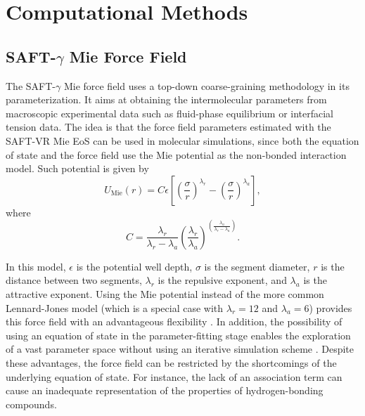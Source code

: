 \documentclass[preprint]{elsarticle}
\begin{document}
	\section{Computational Methods}
	
	\subsection{SAFT-$\gamma$ Mie Force Field}
	
	The SAFT-$\gamma$ Mie force field uses a top-down coarse-graining methodology in its parameterization. It aims at obtaining the intermolecular parameters from macroscopic experimental data such as fluid-phase equilibrium or interfacial tension data. The idea is that the force field parameters estimated with the SAFT-VR Mie EoS \cite{lafitte2013} can be used in molecular simulations, since both the equation of state and the force field use the Mie potential as the non-bonded interaction model. Such potential is given by
	\begin{equation}
	\label{eqn:miepotential}
	U_\text{Mie}(r) = C \epsilon  \left[ \left(\frac{\sigma}{r} \right)^{\lambda_r} - \left(\frac{\sigma}{r} \right)^{\lambda_a} \right],
	\end{equation}
	where
	\begin{equation*}
	C = \frac{\lambda_r}{\lambda_r - \lambda_a} \left(\frac{\lambda_r}{\lambda_a} \right)^{\left( \frac{\lambda_a}{\lambda_r - \lambda_a} \right)}.
	\end{equation*}
	
	In this model, $\epsilon$ is the potential well depth, $\sigma$ is the segment diameter, $r$ is the distance between two segments, $\lambda_r$ is the repulsive exponent, and $\lambda_a$ is the attractive exponent. Using the Mie potential instead of the more common Lennard-Jones model (which is a special case with $\lambda_r = 12$ and $\lambda_a = 6$) provides this force field with an advantageous flexibility \cite{herdes2015}. In addition, the possibility of using an equation of state in the parameter-fitting stage enables the exploration of a vast parameter space without using an iterative simulation scheme \cite{avendano2011}. Despite these advantages, the force field can be restricted by the shortcomings of the underlying equation of state. For instance, the lack of an association term can cause an inadequate representation of the properties of hydrogen-bonding compounds.
	
\end{document}
